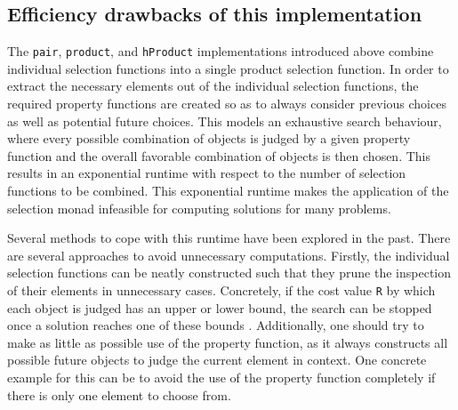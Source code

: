 \documentclass[runningheads]{llncs}
\begin{document}
%

%
%
%
\subsection{Efficiency drawbacks of this implementation}
The \texttt{pair}, \texttt{product}, and \texttt{hProduct} implementations introduced above combine individual selection functions into a single product selection function. In order to extract the necessary elements out of the individual selection functions, the required property functions are created so as to always consider previous choices as well as potential future choices. This models an exhaustive search behaviour, where every possible combination of objects is judged by a given property function and the overall favorable combination of objects is then chosen. This results in an exponential runtime with respect to the number of selection functions to be combined. This exponential runtime makes the application of the selection monad infeasible for computing solutions for many problems.

Several methods to cope with this runtime have been explored in the past. There are several approaches to avoid unnecessary computations. Firstly, the individual selection functions can be neatly constructed such that they prune the inspection of their elements in unnecessary cases. Concretely, if the cost value \texttt{R} by which each object is judged has an upper or lower bound, the search can be stopped once a solution reaches one of these bounds \cite{hartmann2018selectionmonad}. Additionally, one should try to make as little as possible use of the property function, as it always constructs all possible future objects to judge the current element in context. One concrete example for this can be to avoid the use of the property function completely if there is only one element to choose from.
\end{document}
